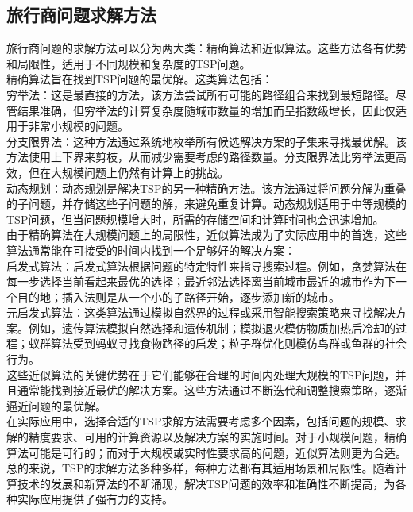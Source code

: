 \documentclass{NauThesis}
\begin{document}
\subsection{旅行商问题求解方法}
旅行商问题的求解方法可以分为两大类：精确算法和近似算法。这些方法各有优势和局限性，适用于不同规模和复杂度的TSP问题。
\\\hspace*{2em}精确算法旨在找到TSP问题的最优解。这类算法包括：
\\\hspace*{2em}穷举法：这是最直接的方法，该方法尝试所有可能的路径组合来找到最短路径。尽管结果准确，但穷举法的计算复杂度随城市数量的增加而呈指数级增长，因此仅适用于非常小规模的问题。
\\\hspace*{2em}分支限界法：这种方法通过系统地枚举所有候选解决方案的子集来寻找最优解。该方法使用上下界来剪枝，从而减少需要考虑的路径数量。分支限界法比穷举法更高效，但在大规模问题上仍然有计算上的挑战。
\\\hspace*{2em}动态规划：动态规划是解决TSP的另一种精确方法。该方法通过将问题分解为重叠的子问题，并存储这些子问题的解，来避免重复计算。动态规划适用于中等规模的TSP问题，但当问题规模增大时，所需的存储空间和计算时间也会迅速增加。
\\\hspace*{2em}由于精确算法在大规模问题上的局限性，近似算法成为了实际应用中的首选，这些算法通常能在可接受的时间内找到一个足够好的解决方案：
\\\hspace*{2em}启发式算法：启发式算法根据问题的特定特性来指导搜索过程。例如，贪婪算法在每一步选择当前看起来最优的选择；最近邻法选择离当前城市最近的城市作为下一个目的地；插入法则是从一个小的子路径开始，逐步添加新的城市。
\\\hspace*{2em}元启发式算法：这类算法通过模拟自然界的过程或采用智能搜索策略来寻找解决方案。例如，遗传算法模拟自然选择和遗传机制；模拟退火模仿物质加热后冷却的过程；蚁群算法受到蚂蚁寻找食物路径的启发；粒子群优化则模仿鸟群或鱼群的社会行为。
\\\hspace*{2em}这些近似算法的关键优势在于它们能够在合理的时间内处理大规模的TSP问题，并且通常能找到接近最优的解决方案。这些方法通过不断迭代和调整搜索策略，逐渐逼近问题的最优解。
\\\hspace*{2em}在实际应用中，选择合适的TSP求解方法需要考虑多个因素，包括问题的规模、求解的精度要求、可用的计算资源以及解决方案的实施时间。对于小规模问题，精确算法可能是可行的；而对于大规模或实时性要求高的问题，近似算法则更为合适。总的来说，TSP的求解方法多种多样，每种方法都有其适用场景和局限性。随着计算技术的发展和新算法的不断涌现，解决TSP问题的效率和准确性不断提高，为各种实际应用提供了强有力的支持。
\end{document}
